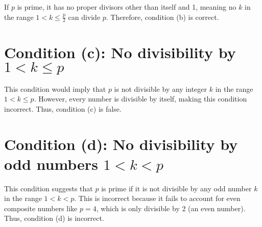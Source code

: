 \documentclass{article}
\begin{document}
If \( p \) is prime, it has no proper divisors other than itself and 1, meaning no \( k \) in the range \( 1 < k \leq \frac{p}{2} \) can divide \( p \). Therefore, condition (b) is correct.

\section*{Condition (c): No divisibility by \( 1 < k \leq p \)}

This condition would imply that \( p \) is not divisible by any integer \( k \) in the range \( 1 < k \leq p \). However, every number is divisible by itself, making this condition incorrect. Thus, condition (c) is false.

\section*{Condition (d): No divisibility by odd numbers \( 1 < k < p \)}

This condition suggests that \( p \) is prime if it is not divisible by any odd number \( k \) in the range \( 1 < k < p \). This is incorrect because it fails to account for even composite numbers like \( p = 4 \), which is only divisible by 2 (an even number). Thus, condition (d) is incorrect.
\end{document}
